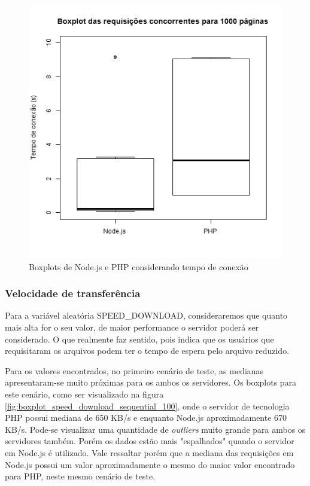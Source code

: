\documentclass[conference,compsoc]{IEEEtran}
\begin{document}
\begin{figure}[h!]
\centering
  \includegraphics[scale=0.35]{plots/boxplots/concurrent/CONNECT_TIME/boxplot_CONNECT_TIME_1000_pages.png}
  \caption{Boxplots de Node.js e PHP considerando tempo de conexão}
    \label{fig:boxplot_connect_time_concurrent_1000}
\end{figure}

\subsubsection{Velocidade de transferência}
Para a variável aleatória SPEED\_DOWNLOAD, consideraremos que quanto mais alta for o seu valor, de maior performance o servidor poderá ser considerado. O que realmente faz sentido, pois indica que os usuários que requisitaram os arquivos podem ter o tempo de espera pelo arquivo reduzido. 


Para os valores encontrados, no primeiro cenário de teste, as medianas apresentaram-se muito próximas para os ambos os servidores. Os boxplots para este cenário, como ser visualizado na figura \ref{fig:boxplot_speed_download_sequential_100}, onde o servidor de tecnologia PHP possui mediana de 650 KB/s e enquanto Node.js aproximadamente 670 KB/s. Pode-se visualizar uma quantidade de \textit{outliers} muito grande para ambos os servidores também. Porém os dados estão mais "espalhados" quando o servidor em Node.js é utilizado. Vale ressaltar porém que a mediana das requisições em Node.js possui um valor aproximadamente o mesmo do maior valor encontrado para PHP, neste mesmo cenário de teste.
\end{document}
